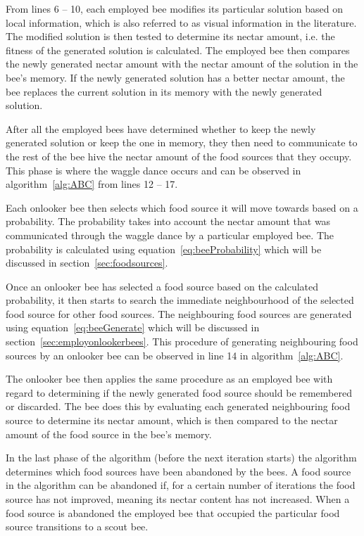 From lines 6 -- 10, each employed bee modifies its particular solution based on local information, which is also referred to as visual information in the literature. The modified solution is then tested to determine its nectar amount, i.e. the fitness of the generated solution is calculated. The employed bee then compares the newly generated nectar amount with the nectar amount of the solution in the bee's memory. If the newly generated solution has a better nectar amount, the bee replaces the current solution in its memory with the newly generated solution.

After all the employed bees have determined whether to keep the newly generated solution or keep the one in memory, they then need to communicate to the rest of the bee hive the nectar amount of the food sources that they occupy. This phase is where the waggle dance occurs and can be observed in algorithm~\ref{alg:ABC} from lines 12 -- 17.

Each onlooker bee then selects which food source it will move towards based on a probability. The probability takes into account the nectar amount that was communicated through the waggle dance by a particular employed bee. The probability is calculated using equation~\ref{eq:beeProbability} which will be discussed in section~\ref{sec:foodsources}.

Once an onlooker bee has selected a food source based on the calculated probability, it then starts to search the immediate neighbourhood of the selected food source for other food sources. The neighbouring food sources are generated using equation~\ref{eq:beeGenerate} which will be discussed in section~\ref{sec:employonlookerbees}. This procedure of generating neighbouring food sources by an onlooker bee can be observed in line 14 in algorithm~\ref{alg:ABC}.

The onlooker bee then applies the same procedure as an employed bee with regard to determining if the newly generated food source should be remembered or discarded. The bee does this by evaluating each generated neighbouring food source to determine its nectar amount, which is then compared to the nectar amount of the food source in the bee's memory.

In the last phase of the algorithm (before the next iteration starts) the algorithm determines which food sources have been abandoned by the bees. A food source in the algorithm can be abandoned if, for a certain number of iterations the food source has not improved, meaning its nectar content has not increased. When a food source is abandoned the employed bee that occupied the particular food source transitions to a scout bee.

